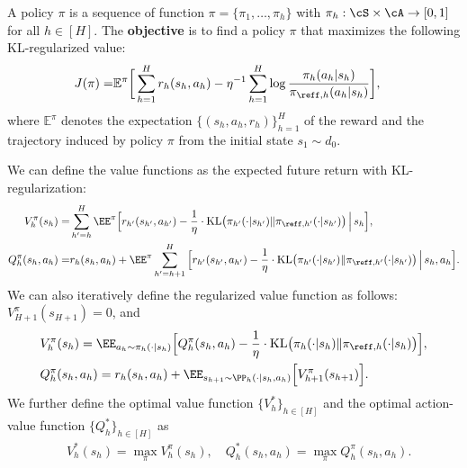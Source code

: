 \documentclass[11pt]{article}
\newcommand{\E}{\mathbb E}
\newcommand{\KL}{\mathrm{KL}}
\begin{document}
A policy $\pi$ is a sequence of function $\pi = \{\pi_1, \ldots, \pi_h\}$ with $\pi_h: \cS \times \cA \to [0, 1]$ for all $h \in [H]$. The \textbf{objective} is to find a policy $\pi$ that maximizes the following KL-regularized value: 
\begin{equation*}
{
\begin{aligned} 
    J(\pi) =& \E^{\pi} \bigg[\sum_{h = 1}^H r_h (s_h, a_h) - \eta^{-1} \sum_{h = 1}^H \log \frac{\pi_h(a_h|s_h)}{\pi_{\reff,h}(a_h|s_h)}\bigg],
\end{aligned}}
\end{equation*}
where $\E^{\pi}$ denotes the expectation $\{(s_h,a_h,r_h)\}_{h=1}^H$ of the reward and the trajectory induced by policy $\pi$ from the initial state $s_1\sim d_0$.

We can define the value functions as the expected future return with KL-regularization:
\begin{equation*}
{
    \begin{aligned}
        V^{\pi}_h(s_h) =& \sum_{h'=h}^H \EE^{\pi}\Big[ r_{h'}(s_{h'}, a_{h'}) - \frac{1}{\eta} \cdot \KL\bigl(\pi_{h'}(\cdot | s_{h'})\| \pi_{\reff,h'}(\cdot | s_{h'})\bigr) \,\Big|\, s_h \Big],\\
        Q^{\pi}_h(s_h, a_h) =& r_h(s_h,a_h)+ \EE^{\pi}\sum_{h'=h+1}^H \Big[r_{h'}(s_{h'}, a_{h'}) - \frac{1}{\eta} \cdot \KL\bigl(\pi_{h'}(\cdot | s_{h'})\|\pi_{\reff,h'}(\cdot | s_{h'})\bigr) \,\Big|\,  s_h, a_h \Big].
    \end{aligned}}
\end{equation*}
We can also iteratively define the regularized value function as follows: $V_{H + 1}^\pi(s_{H + 1}) = 0$, and
\begin{equation*}
{
    \begin{aligned}
        &V_h^\pi(s_h) = \EE_{a_h \sim \pi_h(\cdot | s_h)} \Big[Q_h^\pi(s_h, a_h) - \frac{1}{\eta} \cdot \KL\bigl(\pi_h(\cdot | s_h)\|\pi_{\reff,h}(\cdot | s_h)\bigr)\Big], \\
        &Q_h^\pi(s_h, a_h) = r_h(s_h,a_h) + \EE_{s_{h + 1} \sim \PP_h(\cdot | s_h, a_h)} \Big[V_{h + 1}^\pi(s_{h + 1})\Big].
    \end{aligned}}
\end{equation*}
We further define the optimal value function $\{V_h^*\}_{h \in [H]}$ and the optimal action-value function $\{Q_h^*\}_{h \in [H]}$ as 
$$
\begin{aligned}
    &V_h^*(s_h) = \max_{\pi} V_h^\pi(s_h), \quad Q_h^*(s_h, a_h) = \max_{\pi} Q_h^\pi(s_h, a_h).
\end{aligned}
$$
\end{document}
